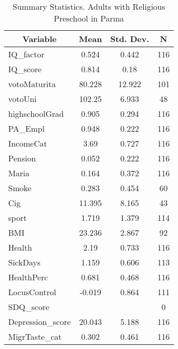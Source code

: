 
\begin{table}[htbp]\centering \caption{Summary Statistics. Adults with Religious Preschool in Parma \label{bothAdultmaternaReliParma}}
\begin{tabular}{l c c  c}\hline\hline
\multicolumn{1}{c}{\textbf{Variable}} & \textbf{Mean}
 & \textbf{Std. Dev.} & \textbf{N}\\ \hline
IQ\_factor & 0.524 & 0.442  & 116\\
IQ\_score & 0.814 & 0.18  & 116\\
votoMaturita & 80.228 & 12.922  & 101\\
votoUni & 102.25 & 6.933  & 48\\
highschoolGrad & 0.905 & 0.294  & 116\\
PA\_Empl & 0.948 & 0.222  & 116\\
IncomeCat & 3.69 & 0.727  & 116\\
Pension & 0.052 & 0.222  & 116\\
Maria & 0.164 & 0.372  & 116\\
Smoke & 0.283 & 0.454  & 60\\
Cig & 11.395 & 8.165  & 43\\
sport & 1.719 & 1.379  & 114\\
BMI & 23.236 & 2.867  & 92\\
Health & 2.19 & 0.733  & 116\\
SickDays & 1.159 & 0.606  & 113\\
HealthPerc & 0.681 & 0.468  & 116\\
LocusControl & -0.019 & 0.864  & 111\\
SDQ\_score &  &   & 0\\
Depression\_score & 20.043 & 5.188  & 116\\
MigrTaste\_cat & 0.302 & 0.461  & 116\\
\hline\end{tabular}
\end{table}
